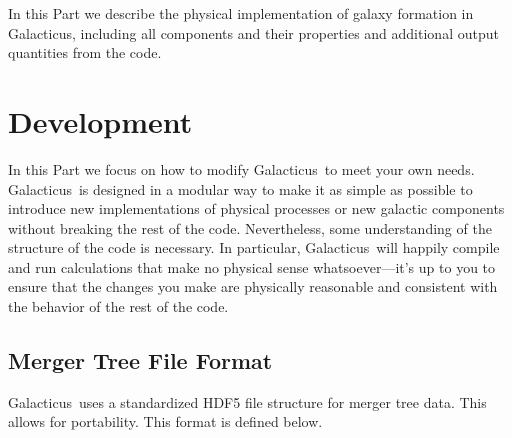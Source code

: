 \documentclass[letterpaper,10pt]{book}
\def\glc{{\sc Galacticus}}
\begin{document}
In this Part we describe the physical implementation of galaxy formation in \glc, including all components and their properties and additional output quantities from the code.







\part{Development}

In this Part we focus on how to modify \glc\ to meet your own needs. \glc\ is designed in a modular way to make it as simple as possible to introduce new implementations of physical processes or new galactic components without breaking the rest of the code. Nevertheless, some understanding of the structure of the code is necessary. In particular, \glc\ will happily compile and run calculations that make no physical sense whatsoever---it's up to you to ensure that the changes you make are physically reasonable and consistent with the behavior of the rest of the code.









\appendix

\chapter{Merger Tree File Format}\label{sec:MergerTreeFileFormat}

\glc\ uses a standardized HDF5 file structure for merger tree data. This allows for portability. This format is defined below.







\backmatter




\citeindextrue
\printindex
\printindex[code]
\end{document}
